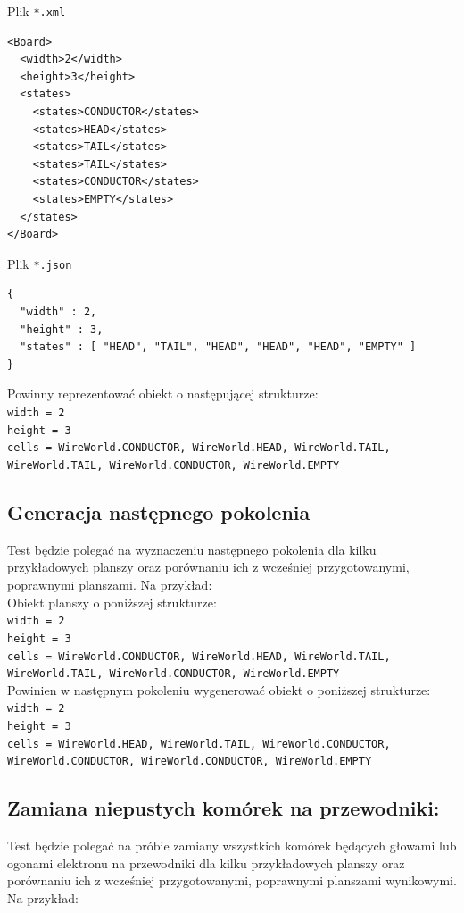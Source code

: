 \documentclass{report}
\begin{document}
\noindent Plik \texttt{*.xml}
\begin{verbatim}
<Board>
  <width>2</width>
  <height>3</height>
  <states>
    <states>CONDUCTOR</states>
    <states>HEAD</states>
    <states>TAIL</states>
    <states>TAIL</states>
    <states>CONDUCTOR</states>
    <states>EMPTY</states>
  </states>
</Board>
\end{verbatim}
\noindent Plik \texttt{*.json}
\begin{verbatim}
{
  "width" : 2,
  "height" : 3,
  "states" : [ "HEAD", "TAIL", "HEAD", "HEAD", "HEAD", "EMPTY" ]
}
\end{verbatim}

Powinny reprezentować obiekt o następującej strukturze:\\

\noindent \texttt{width = 2}\\
\texttt{height = 3}\\
\texttt{cells = {WireWorld.CONDUCTOR, WireWorld.HEAD, WireWorld.TAIL, WireWorld.TAIL, WireWorld.CONDUCTOR, WireWorld.EMPTY}}

\subsection{Generacja następnego pokolenia}
Test będzie polegać na wyznaczeniu następnego pokolenia dla kilku przykładowych planszy oraz porównaniu ich z wcześniej przygotowanymi, poprawnymi planszami. Na przykład:\\

Obiekt planszy o poniższej strukturze:\\

\noindent \texttt{width = 2}\\
\texttt{height = 3}\\
\texttt{cells = {WireWorld.CONDUCTOR, WireWorld.HEAD, WireWorld.TAIL, WireWorld.TAIL, WireWorld.CONDUCTOR, WireWorld.EMPTY}}\\

Powinien w następnym pokoleniu wygenerować obiekt o poniższej strukturze:\\

\noindent \texttt{width = 2}\\
\texttt{height = 3}\\
\texttt{cells = {WireWorld.HEAD, WireWorld.TAIL, WireWorld.CONDUCTOR, WireWorld.CONDUCTOR, WireWorld.CONDUCTOR, WireWorld.EMPTY}}\\

\subsection{Zamiana niepustych komórek na przewodniki:}
Test będzie polegać na próbie zamiany wszystkich komórek będących głowami lub ogonami elektronu na przewodniki dla kilku przykładowych planszy oraz porównaniu ich z wcześniej przygotowanymi, poprawnymi planszami wynikowymi. Na przykład:\\
\end{document}
